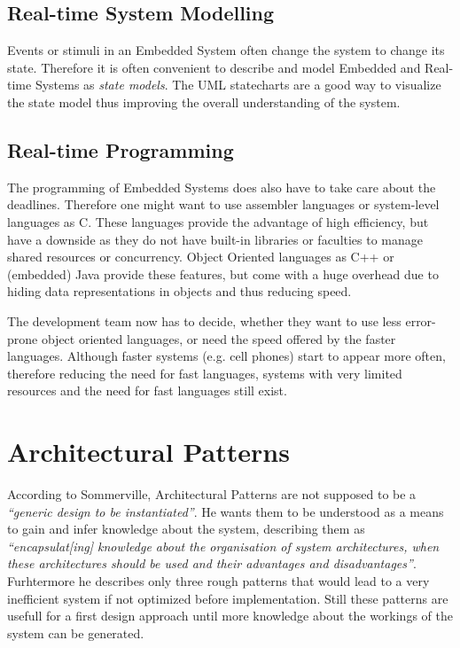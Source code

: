 \documentclass[10pt,a4paper,titlepage,draft]{article} %
\begin{document}
\subsection{Real-time System Modelling}
Events or stimuli in an Embedded System often change the system to change its state.
Therefore it is often convenient to describe and model Embedded and Real-time Systems as \emph{state models}.
The UML statecharts are a good way to visualize the state model thus improving the overall understanding of the system.

\subsection{Real-time Programming}
The programming of Embedded Systems does also have to take care about the deadlines.
Therefore one might want to use assembler languages or system-level languages as C.
These languages provide the advantage of high efficiency, but have a downside as they do not have built-in libraries or faculties to manage shared resources or concurrency.
Object Oriented languages as C++ or (embedded) Java provide these features, but come with a huge overhead due to hiding data representations in objects and thus reducing speed.

The development team now has to decide, whether they want to use less error-prone object oriented languages, or need the speed offered by the faster languages.
Although faster systems (e.g. cell phones) start to appear more often, therefore reducing the need for fast languages, systems with very limited resources and the need for fast languages still exist.


\section{Architectural Patterns}
According to Sommerville, Architectural Patterns are not supposed to be a \textit{``generic design to be instantiated''\cite[p. 547]{sommerville}}.
He wants them to be understood as a means to gain and infer knowledge about the system, describing them as \textit{``encapsulat[ing] knowledge about the organisation of system architectures, when these architectures should be used and their advantages and disadvantages''\cite[p.547]{sommerville}}.
Furhtermore he describes only three rough patterns that would lead to a very inefficient system if not optimized before implementation.
Still these patterns are usefull for a first design approach until more knowledge about the workings of the system can be generated.
\end{document}
